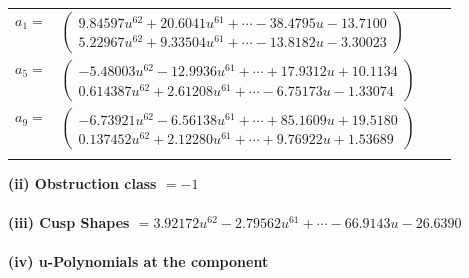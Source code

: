 \documentclass[1p]{elsarticle_modified}
\theoremstyle{definition}
\begin{document}
\begin{tabular}{m{7pt} m{180pt} m{7pt} m{180pt} }
\flushright $a_{1}=$&$\begin{pmatrix}9.84597 u^{62}+20.6041 u^{61}+\cdots-38.4795 u-13.7100\\5.22967 u^{62}+9.33504 u^{61}+\cdots-13.8182 u-3.30023\end{pmatrix}$ \\
\flushright $a_{5}=$&$\begin{pmatrix}-5.48003 u^{62}-12.9936 u^{61}+\cdots+17.9312 u+10.1134\\0.614387 u^{62}+2.61208 u^{61}+\cdots-6.75173 u-1.33074\end{pmatrix}$ \\
\flushright $a_{9}=$&$\begin{pmatrix}-6.73921 u^{62}-6.56138 u^{61}+\cdots+85.1609 u+19.5180\\0.137452 u^{62}+2.12280 u^{61}+\cdots+9.76922 u+1.53689\end{pmatrix}$\\&\end{tabular}
\flushleft \textbf{(ii) Obstruction class $= -1$}\\~\\
\flushleft \textbf{(iii) Cusp Shapes $= 3.92172 u^{62}-2.79562 u^{61}+\cdots-66.9143 u-26.6390$}\\~\\
\newpage\renewcommand{\arraystretch}{1}
\flushleft \textbf{(iv) u-Polynomials at the component}\newline \\
\end{document}
